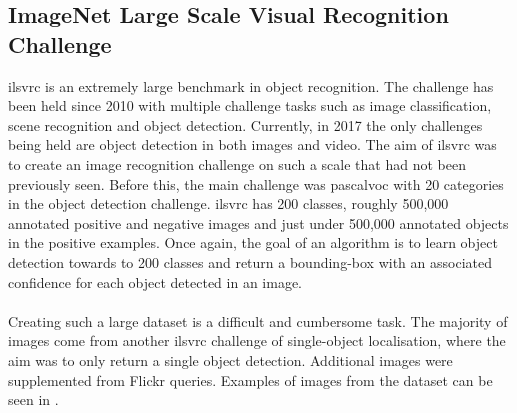 \subsection{ImageNet Large Scale Visual Recognition Challenge}
\gls{ilsvrc} is an extremely large benchmark in object recognition. The challenge has been held since 2010 with multiple challenge tasks such as image classification, scene recognition and object detection. Currently, in 2017 the only challenges being held are object detection in both images and video. The aim of \gls{ilsvrc} was to create an image recognition challenge on such a scale that had not been previously seen. Before this, the main challenge was \gls{pascalvoc} with 20 categories in the object detection challenge. \gls{ilsvrc} has 200 classes, roughly 500,000 annotated positive and negative images and just under 500,000 annotated objects in the positive examples. Once again, the goal of an algorithm is to learn object detection towards to 200 classes and return a bounding-box with an associated confidence for each object detected in an image.
\\\\
Creating such a large dataset is a difficult and cumbersome task. The majority of images come from another \gls{ilsvrc} challenge of single-object localisation, where the aim was to only return a single object detection. Additional images were supplemented from Flickr queries. Examples of images from the dataset can be seen in .


